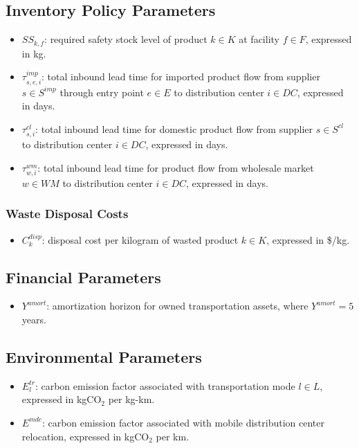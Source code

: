 \documentclass[12pt]{article}
\begin{document}
\subsection{Inventory Policy Parameters}

\begin{itemize}
    \item $SS_{k,f}$: required safety stock level of product $k \in K$ at facility $f \in F$, expressed in kg.

    \item $\tau^{imp}_{s,e,i}$: total inbound lead time for imported product flow from supplier $s \in S^{imp}$ through entry point $e \in E$ to distribution center $i \in DC$, expressed in days.

    \item $\tau^{cl}_{s,i}$: total inbound lead time for domestic product flow from supplier $s \in S^{cl}$ to distribution center $i \in DC$, expressed in days.

    \item $\tau^{wm}_{w,i}$: total inbound lead time for product flow from wholesale market $w \in WM$ to distribution center $i \in DC$, expressed in days.
\end{itemize}

\subsubsection{Waste Disposal Costs}
\begin{itemize}
    \item $C^{disp}_{k}$: disposal cost per kilogram of wasted product $k \in K$, expressed in \$/kg.
\end{itemize}

\subsection{Financial Parameters}

\begin{itemize}
    \item $Y^{amort}$: amortization horizon for owned transportation assets, where $Y^{amort} = 5$ years.
\end{itemize}

\subsection{Environmental Parameters}

\begin{itemize}
    \item $E^{tr}_{l}$: carbon emission factor associated with transportation mode $l \in L$, expressed in kgCO$_2$ per kg-km.

    \item $E^{mdc}$: carbon emission factor associated with mobile distribution center relocation, expressed in kgCO$_2$ per km.
\end{itemize}
\end{document}
